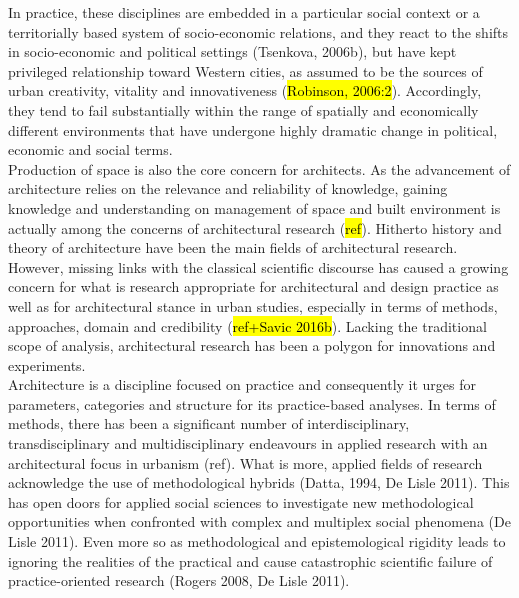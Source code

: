 \documentclass[11pt]{report}
\begin{document}
In practice, these disciplines are embedded in a particular social context or a territorially based system of socio-economic relations, and they react to the shifts in socio-economic and political settings (Tsenkova, 2006b), but have kept privileged relationship toward Western cities, as assumed to be the sources of urban creativity, vitality and innovativeness (\hl{Robinson, 2006:2}). Accordingly, they tend to fail substantially within the range of spatially and economically different environments that have undergone highly dramatic change in political, economic and social terms. 
\\
Production of space is also the core concern for architects. As the advancement of architecture relies on the   relevance and reliability of knowledge, gaining knowledge and understanding on management of space and built environment is actually among the concerns of architectural research (\hl{ref}). Hitherto history and theory of architecture have been the main fields of architectural research. However, missing links with the classical scientific discourse has caused a growing concern for what is research appropriate for architectural and design practice as well as for architectural stance in urban studies, especially in terms of methods, approaches, domain and credibility (\hl{ref+Savic 2016b}). Lacking the traditional scope of analysis, architectural research has been a polygon for innovations and experiments.
\\
Architecture is a discipline focused on practice and consequently it urges for parameters, categories and structure for its practice-based analyses. In terms of methods, there has been a significant number of interdisciplinary, transdisciplinary and multidisciplinary endeavours in applied research with an architectural focus in urbanism (ref). What is more, applied fields of research acknowledge the use of methodological hybrids (Datta, 1994, De Lisle 2011). This has open doors for applied social sciences to investigate new methodological opportunities when confronted with complex and multiplex social phenomena (De Lisle 2011). Even more so as methodological and epistemological rigidity leads to ignoring the realities of the practical and cause catastrophic scientific failure of practice-oriented research (Rogers 2008, De Lisle 2011).
\end{document}
